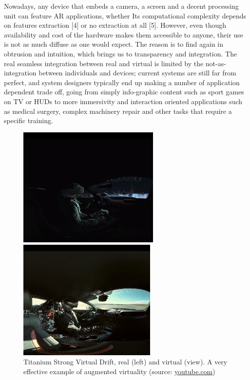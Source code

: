 Nowadays, any device that embeds a camera, a screen and a decent processing unit can feature AR applications, whether Its computational complexity depends on features extraction [4] or no extraction at all [5]. However, even though availability and cost of the hardware makes them accessible to anyone, their use is not as much diffuse as one would expect. The reason is to find again in obtrusion and intuition, which brings us to transparency and integration. The real seamless integration between real and virtual is limited by the not-as-integration between individuals and devices; current systems are still far from perfect, and system designers typically end up making a number of application dependent trade off, going from simply info-graphic content such as sport games on TV or HUDs to more immersivity and interaction oriented applications such as medical surgery, complex machinery repair and other tasks that require a specific training.

\begin{figure}
\centering
\begin{subfigure}    
\begin{minipage}[t]{0.49\textwidth}
\includegraphics[width=\linewidth, height=6cm]{pictures/titanium-a}
\end{minipage}
\hspace{\fill}
\begin{minipage}[t]{0.49\textwidth}
\includegraphics[width=\linewidth, height=6cm]{pictures/titanium-b}
\end{minipage}
\end{subfigure}
\vspace*{-6mm}
\caption{Titanium Strong Virtual Drift, real (left) and virtual (view). A very effective example of augmented virtuality (source: \href{https://www.youtube.com/watch?v=WJyG76Izk8M}{youtube.com})}
\end{figure}

